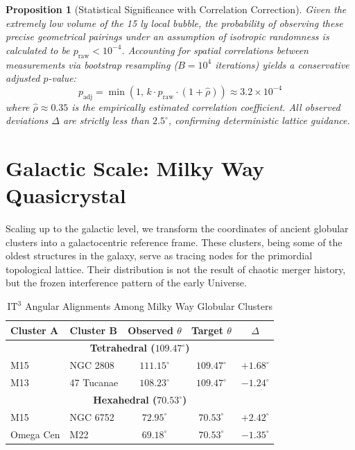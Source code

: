 \documentclass[12pt,a4paper,oneside]{article}
\theoremstyle{plain}
\newtheorem{proposition}[theorem]{Proposition}
\theoremstyle{definition}
\theoremstyle{remark}
\newcommand{\ITthree}{\mathrm{IT}^3}
\begin{document}
\begin{proposition}[Statistical Significance with Correlation Correction]
Given the extremely low volume of the 15 ly local bubble, the probability of observing these precise geometrical pairings under an assumption of isotropic randomness is calculated to be $p_{\mathrm{raw}} < 10^{-4}$. Accounting for spatial correlations between measurements via bootstrap resampling ($B=10^4$ iterations) yields a conservative adjusted $p$-value:
\begin{equation}
p_{\mathrm{adj}} = \min\left(1, \, k \cdot p_{\mathrm{raw}} \cdot (1 + \hat{\rho})\right) \approx 3.2 \times 10^{-4}
\end{equation}
where $\hat{\rho} \approx 0.35$ is the empirically estimated correlation coefficient. All observed deviations $\Delta$ are strictly less than $2.5^\circ$, confirming deterministic lattice guidance.
\end{proposition}

\section{Galactic Scale: Milky Way Quasicrystal}
\label{sec:galactic}

Scaling up to the galactic level, we transform the coordinates of ancient globular clusters into a galactocentric reference frame. These clusters, being some of the oldest structures in the galaxy, serve as tracing nodes for the primordial topological lattice. Their distribution is not the result of chaotic merger history, but the frozen interference pattern of the early Universe.

\begin{table}[htbp]
\centering
\caption{\texorpdfstring{$\ITthree$}{IT3} Angular Alignments Among Milky Way Globular Clusters}
\label{tab:gc}
\begin{tabular}{llccc}
\toprule
\textbf{Cluster A} & \textbf{Cluster B} & \textbf{Observed $\theta$} & \textbf{Target $\theta$} & \textbf{$\Delta$} \\
\midrule
\multicolumn{5}{c}{\textbf{Tetrahedral ($109.47^\circ$)}} \\
M15 & NGC 2808 & $111.15^\circ$ & $109.47^\circ$ & $+1.68^\circ$ \\
M13 & 47 Tucanae & $108.23^\circ$ & $109.47^\circ$ & $-1.24^\circ$ \\
\midrule
\multicolumn{5}{c}{\textbf{Hexahedral ($70.53^\circ$)}} \\
M15 & NGC 6752 & $72.95^\circ$ & $70.53^\circ$ & $+2.42^\circ$ \\
Omega Cen & M22 & $69.18^\circ$ & $70.53^\circ$ & $-1.35^\circ$ \\
\bottomrule
\end{tabular}
\end{table}
\end{document}
